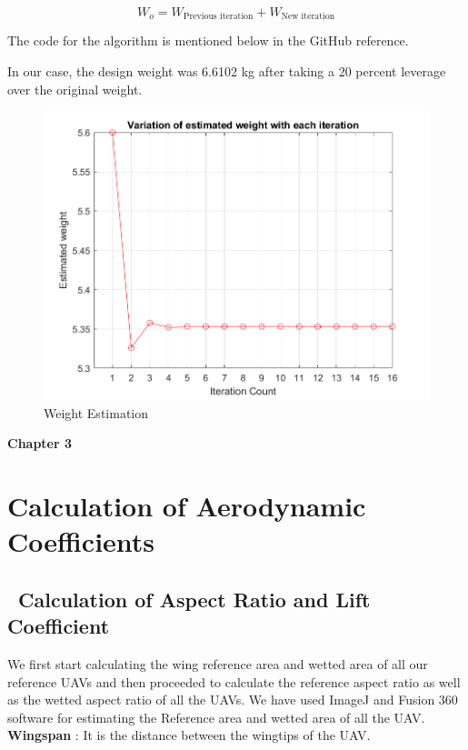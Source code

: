 \documentclass[12 pt]{article}
\begin{document}
$$ W_o = W_{\text{Previous iteration}} + W_{\text{New iteration}} $$

The code for the algorithm is mentioned below in the GitHub reference.

In our case, the design weight was 6.6102 kg after taking a 20 percent leverage over the original weight.

\begin{figure}
    \centering
    \includegraphics[width=0.75\linewidth]{Codes/Week 2/weight.png}
    \caption{Weight Estimation}
    \label{Weight Estimation}
\end{figure}

\vfill

\afterpage{\clearpage}

\newpage

\textbf{\Huge{Chapter 3}}

\section{Calculation of Aerodynamic Coefficients}

\subsection{\ Calculation of Aspect Ratio and Lift Coefficient}

We first start calculating the wing reference area and wetted area of all our reference UAVs and then proceeded to calculate the reference aspect ratio as well as the wetted aspect ratio of all the UAVs. We have used ImageJ and Fusion 360 software for estimating the Reference area and wetted area of all the UAV.\\

\textbf{Wingspan} : It is the distance between the wingtips of the UAV.\\
\end{document}
